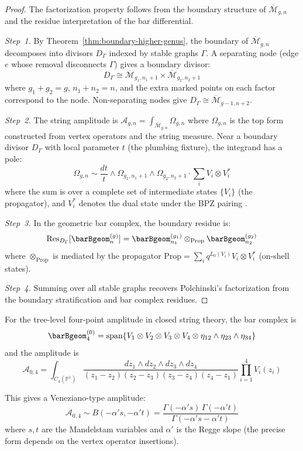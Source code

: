 \begin{proof}
The factorization property follows from the boundary structure of $\overline{\mathcal{M}}_{g,n}$ and the residue interpretation of the bar differential.

\emph{Step~1.}
By Theorem~\ref{thm:boundary-higher-genus}, the boundary of $\overline{\mathcal{M}}_{g,n}$ decomposes into divisors $D_\Gamma$ indexed by stable graphs $\Gamma$.  A separating node (edge $e$ whose removal disconnects $\Gamma$) gives a boundary divisor:
\[
D_\Gamma \cong \overline{\mathcal{M}}_{g_1, n_1+1} \times \overline{\mathcal{M}}_{g_2, n_2+1}
\]
where $g_1 + g_2 = g$, $n_1 + n_2 = n$, and the extra marked points on each factor correspond to the node.  Non-separating nodes give $D_\Gamma \cong \overline{\mathcal{M}}_{g-1, n+2}$.

\emph{Step~2.}
The string amplitude is $\mathcal{A}_{g,n} = \int_{\overline{\mathcal{M}}_{g,n}} \Omega_{g,n}$ where $\Omega_{g,n}$ is the top form constructed from vertex operators and the string measure.  Near a boundary divisor $D_\Gamma$ with local parameter $t$ (the plumbing fixture), the integrand has a pole:
\[
\Omega_{g,n} \sim \frac{dt}{t} \wedge \Omega_{g_1, n_1+1} \wedge \Omega_{g_2, n_2+1} \cdot \sum_i V_i \otimes V_i^*
\]
where the sum is over a complete set of intermediate states $\{V_i\}$ (the propagator), and $V_i^*$ denotes the dual state under the BPZ pairing \cite{BPZ84}.

\emph{Step~3.}
In the geometric bar complex, the boundary residue is:
\[
\operatorname{Res}_{D_\Gamma}[\barBgeom^{(g)}_n] = \barBgeom^{(g_1)}_{n_1} \otimes_{\mathrm{Prop}} \barBgeom^{(g_2)}_{n_2}
\]
where $\otimes_{\mathrm{Prop}}$ is mediated by the propagator $\mathrm{Prop} = \sum_i q^{L_0(V_i)} V_i \otimes V_i^*$ (on-shell states).

\emph{Step~4.}
Summing over all stable graphs recovers Polchinski's factorization \cite{Pol98} from the boundary stratification and bar complex residues.
\end{proof}

\begin{example}
For the tree-level four-point amplitude in closed string theory, the bar complex is
\[\barBgeom^{(0)}_4 = \text{span}\{V_1 \otimes V_2 \otimes V_3 \otimes V_4 \otimes \eta_{12} \wedge \eta_{23} \wedge \eta_{34}\}\]
and the amplitude is
\[\mathcal{A}_{0,4} = \int_{\overline{C}_4(\mathbb{P}^1)} \frac{dz_1 \wedge dz_2 \wedge dz_3 \wedge dz_4}{(z_1-z_2)(z_2-z_3)(z_3-z_4)(z_4-z_1)} \prod_{i=1}^4 V_i(z_i)\]

This gives a Veneziano-type amplitude:
\[\mathcal{A}_{0,4} \sim B(-\alpha' s, -\alpha' t) = \frac{\Gamma(-\alpha' s)\,\Gamma(-\alpha' t)}{\Gamma(-\alpha' s - \alpha' t)}\]
where $s, t$ are the Mandelstam variables and $\alpha'$ is the Regge slope (the precise form depends on the vertex operator insertions).
\end{example}

